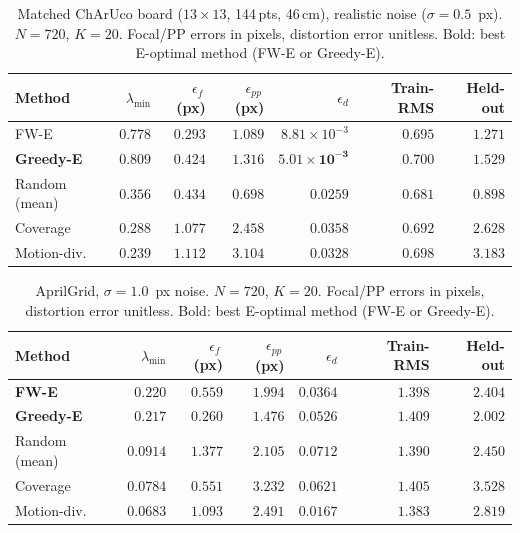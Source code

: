 \documentclass[11pt]{article}
\begin{document}
\begin{table}[ht]
\centering
\setlength{\tabcolsep}{4pt}
\caption{Matched ChArUco board ($13{\times}13$, 144\,pts, 46\,cm), realistic noise ($\sigma{=}0.5$~px). $N{=}720$, $K{=}20$.
Focal/PP errors in pixels, distortion error unitless. Bold: best E-optimal method (FW-E or Greedy-E).}
\label{tab:charuco_sigma05}
\begin{tabular}{lrrrrrr}
\toprule
Method & $\lambda_{\min}$ & $\epsilon_f$\,(px) & $\epsilon_{pp}$\,(px) & $\epsilon_d$ & Train-RMS & Held-out \\
\midrule
FW-E              & $0.778$ & $\mathbf{0.293}$ & $\mathbf{1.089}$ & $8.81\!\times\!10^{-3}$ & $\mathbf{0.695}$ & $\mathbf{1.271}$ \\
\textbf{Greedy-E} & $\mathbf{0.809}$ & $0.424$ & $1.316$ & $\mathbf{5.01\!\times\!10^{-3}}$ & $0.700$ & $1.529$ \\
Random (mean)     & $0.356$ & $0.434$ & $0.698$ & $0.0259$ & $0.681$ & $0.898$ \\
Coverage          & $0.288$ & $1.077$ & $2.458$ & $0.0358$ & $0.692$ & $2.628$ \\
Motion-div.       & $0.239$ & $1.112$ & $3.104$ & $0.0328$ & $0.698$ & $3.183$ \\
\bottomrule
\end{tabular}
\end{table}

\begin{table}[ht]
\centering
\setlength{\tabcolsep}{4pt}
\caption{AprilGrid, $\sigma{=}1.0$~px noise. $N{=}720$, $K{=}20$.
Focal/PP errors in pixels, distortion error unitless. Bold: best E-optimal method (FW-E or Greedy-E).}
\label{tab:aprilgrid_sigma10}
\begin{tabular}{lrrrrrr}
\toprule
Method & $\lambda_{\min}$ & $\epsilon_f$\,(px) & $\epsilon_{pp}$\,(px) & $\epsilon_d$ & Train-RMS & Held-out \\
\midrule
\textbf{FW-E}     & $\mathbf{0.220}$ & $0.559$ & $1.994$ & $\mathbf{0.0364}$ & $\mathbf{1.398}$ & $2.404$ \\
\textbf{Greedy-E} & $0.217$ & $\mathbf{0.260}$ & $\mathbf{1.476}$ & $0.0526$ & $1.409$ & $\mathbf{2.002}$ \\
Random (mean)     & $0.0914$ & $1.377$ & $2.105$ & $0.0712$ & $1.390$ & $2.450$ \\
Coverage          & $0.0784$ & $0.551$ & $3.232$ & $0.0621$ & $1.405$ & $3.528$ \\
Motion-div.       & $0.0683$ & $1.093$ & $2.491$ & $0.0167$ & $1.383$ & $2.819$ \\
\bottomrule
\end{tabular}
\end{table}
\end{document}
